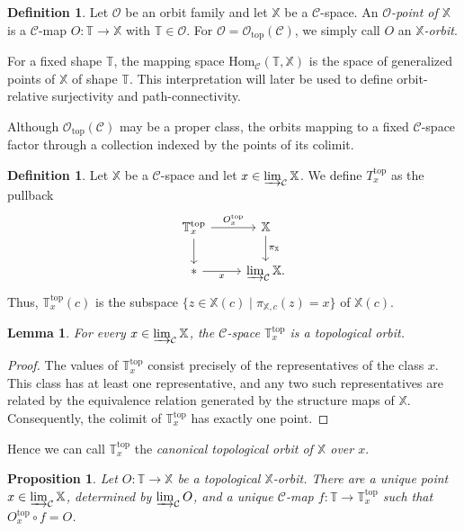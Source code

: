 \documentclass[12pt]{amsart}
\newtheorem{lemma}[teo]{Lemma}
\newtheorem{prop}[teo]{Proposition}
\theoremstyle{definition}
\newtheorem{defi}[teo]{Definition}
\theoremstyle{remark}
\numberwithin{figure}{section}%
\newcommand{\CC}{\mathcal{C}}
\newcommand{\X}{\mathbb{X}}
\newcommand{\T}{\mathbb{T}}
\newcommand{\Hom}{\mathrm{Hom}}
\begin{document}
\begin{defi}
Let $\mathcal O$ be an orbit family and let $\X$ be a $\CC$-space. An
\emph{$\mathcal O$-point of $\X$} is a $\CC$-map
$O\colon\T\to\X$ with $\T\in\mathcal O$. For
$\mathcal O=\mathcal O_{\mathrm{top}}(\CC)$, we simply call $O$ an
\emph{$\X$-orbit}.
\end{defi}

For a fixed shape $\T$, the mapping space $\Hom_{\CC}(\T,\X)$ is the
space of generalized points of $\X$ of shape $\T$. This interpretation
will later be used to define orbit-relative surjectivity and
path-connectivity.

Although $\mathcal O_{\mathrm{top}}(\CC)$ may be a proper class, the
orbits mapping to a fixed $\CC$-space factor through a collection indexed
by the points of its colimit.

\begin{defi}\label{def:canonical-topological-orbit}
Let $\X$ be a $\CC$-space and let
$x\in\varinjlim_{\CC}\X$. We define $T_x^{\mathrm{top}}$ as the pullback
\[
\begin{tikzcd}
\T_x^{\mathrm{top}}
  \arrow[r,"O_x^{\mathrm{top}}"]
  \arrow[d]
&
\X
  \arrow[d,"\pi_{\X}"]
\\
*
  \arrow[r,"x"']
&
\varinjlim_{\CC}\X.
\end{tikzcd}
\]
Thus, $\T_x^{\mathrm{top}}(c)$ is the subspace
$\{z\in\X(c)\mid\pi_{\X,c}(z)=x\}$ of $\X(c)$.
\end{defi}

\begin{lemma}\label{lem:canonical-topological-orbit}
For every $x\in\varinjlim_{\CC}\X$, the $\CC$-space
$\T_x^{\mathrm{top}}$ is a topological orbit.
\end{lemma}

\begin{proof}
The values of $\T_x^{\mathrm{top}}$ consist precisely of the
representatives of the class $x$. This class has at least one
representative, and any two such representatives are related by the
equivalence relation generated by the structure maps of $\X$.
Consequently, the colimit of $\T_x^{\mathrm{top}}$ has exactly one
point.
\end{proof}

Hence we can call $\T_x^{\mathrm{top}}$ the \emph{canonical topological orbit of $\X$ over $x$}.

\begin{prop}\label{pro:Orbits_point}
Let $O\colon\T\to\X$ be a topological $\X$-orbit. There are a unique
point $x\in\varinjlim_{\CC}\X$, determined by
$\varinjlim_{\CC}O$, and a unique $\CC$-map
$f\colon\T\to\T_x^{\mathrm{top}}$ such that
$O_x^{\mathrm{top}}\circ f=O$.
\end{prop}
\end{document}
